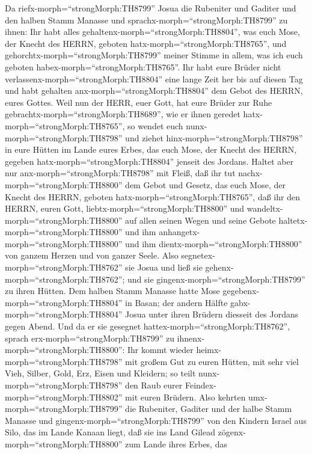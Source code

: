  Da riefx-morph=``strongMorph:TH8799'' Josua die Rubeniter
und Gaditer und den halben Stamm Manasse  und
sprachx-morph=``strongMorph:TH8799'' zu ihnen: Ihr habt alles
gehaltenx-morph=``strongMorph:TH8804'', was euch Mose, der Knecht des
HERRN, geboten hatx-morph=``strongMorph:TH8765'', und
gehorchtx-morph=``strongMorph:TH8799'' meiner Stimme in allem, was ich
euch geboten habex-morph=``strongMorph:TH8765''.  Ihr habt
eure Brüder nicht verlassenx-morph=``strongMorph:TH8804'' eine lange
Zeit her bis auf diesen Tag und habt gehalten
anx-morph=``strongMorph:TH8804'' dem Gebot des HERRN, eures Gottes.
 Weil nun der HERR, euer Gott, hat eure Brüder zur Ruhe
gebrachtx-morph=``strongMorph:TH8689'', wie er ihnen geredet
hatx-morph=``strongMorph:TH8765'', so wendet euch
nunx-morph=``strongMorph:TH8798'' und ziehet
hinx-morph=``strongMorph:TH8798'' in eure Hütten im Lande eures Erbes,
das euch Mose, der Knecht des HERRN, gegeben
hatx-morph=``strongMorph:TH8804'' jenseit des Jordans. 
Haltet aber nur anx-morph=``strongMorph:TH8798'' mit Fleiß, daß ihr tut
nachx-morph=``strongMorph:TH8800'' dem Gebot und Gesetz, das euch Mose,
der Knecht des HERRN, geboten hatx-morph=``strongMorph:TH8765'', daß ihr
den HERRN, euren Gott, liebtx-morph=``strongMorph:TH8800'' und
wandeltx-morph=``strongMorph:TH8800'' auf allen seinen Wegen und seine
Gebote haltetx-morph=``strongMorph:TH8800'' und ihm
anhangetx-morph=``strongMorph:TH8800'' und ihm
dientx-morph=``strongMorph:TH8800'' von ganzem Herzen und von ganzer
Seele.  Also segnetex-morph=``strongMorph:TH8762'' sie Josua
und ließ sie gehenx-morph=``strongMorph:TH8762''; und sie
gingenx-morph=``strongMorph:TH8799'' zu ihren Hütten.  Dem
halben Stamm Manasse hatte Mose gegebenx-morph=``strongMorph:TH8804'' in
Basan; der andern Hälfte gabx-morph=``strongMorph:TH8804'' Josua unter
ihren Brüdern diesseit des Jordans gegen Abend. Und da er sie gesegnet
hattex-morph=``strongMorph:TH8762'',  sprach
erx-morph=``strongMorph:TH8799'' zu ihnenx-morph=``strongMorph:TH8800'':
Ihr kommt wieder heimx-morph=``strongMorph:TH8798'' mit großem Gut zu
euren Hütten, mit sehr viel Vieh, Silber, Gold, Erz, Eisen und Kleidern;
so teilt nunx-morph=``strongMorph:TH8798'' den Raub eurer
Feindex-morph=``strongMorph:TH8802'' mit euren Brüdern. 
Also kehrten umx-morph=``strongMorph:TH8799'' die Rubeniter, Gaditer und
der halbe Stamm Manasse und gingenx-morph=``strongMorph:TH8799'' von den
Kindern Israel aus Silo, das im Lande Kanaan liegt, daß sie ins Land
Gilead zögenx-morph=``strongMorph:TH8800'' zum Lande ihres Erbes, das
